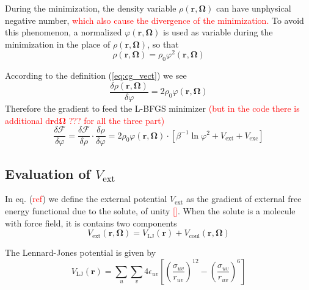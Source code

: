 During the minimization, the density variable $\rho(\mathbf{r},\mathbf{\Omega})$
can have unphysical negative number, \textcolor{red}{which also cause
the divergence of the minimization.} To avoid this phenomenon, a normalized
$\varphi(\mathbf{r},\mathbf{\Omega})$ is used as variable during
the minimization in the place of $\rho(\mathbf{r},\mathbf{\Omega})$,
so that
\begin{equation}
\rho(\mathbf{r},\mathbf{\Omega})=\rho_{0}\varphi^{2}(\mathbf{r},\mathbf{\Omega})\label{eq:cg_vect}
\end{equation}


According to the definition (\ref{eq:cg_vect}) we see
\begin{equation}
\frac{\delta\rho(\mathbf{r},\mathbf{\Omega})}{\delta\varphi}=2\rho_{0}\varphi(\mathbf{r},\mathbf{\Omega})
\end{equation}
Therefore the gradient to feed the L-BFGS minimizer \textcolor{red}{(but
in the code there is additional $\mathrm{d}\mathbf{r}\mathrm{d}\mathbf{\Omega}$
??? for all the three part)}
\begin{equation}
\frac{\delta\mathcal{F}}{\delta\varphi}=\frac{\delta\mathcal{F}}{\delta\rho}\cdot\frac{\delta\rho}{\delta\varphi}=2\rho_{0}\varphi(\mathbf{r},\mathbf{\Omega})\cdot\left[\beta^{-1}\ln\varphi^{2}+V_{\mathrm{ext}}+V_{\mathrm{exc}}\right]
\end{equation}



\subsection{Evaluation of $V_{\mathrm{ext}}$}

In eq. (\textcolor{red}{ref}) we define the external potential $V_{\mathrm{ext}}$
as the gradient of external free energy functional due to the solute,
of unity \textcolor{red}{{[}{]}}. When the solute is a molecule with
force field, it is contains two components
\begin{equation}
V_{\mathrm{ext}}(\mathbf{r},\mathbf{\Omega})=V_{\mathrm{LJ}}(\mathbf{r})+V_{\mathrm{coul}}(\mathbf{r},\mathbf{\Omega})
\end{equation}


The Lennard-Jones potential is given by
\begin{equation}
V_{\mathrm{LJ}}(\mathbf{r})=\sum_{u}\sum_{v}4\epsilon_{uv}\left[\left(\dfrac{\sigma_{uv}}{r_{uv}}\right)^{12}-\left(\dfrac{\sigma_{uv}}{r_{uv}}\right)^{6}\right]\label{eq:LJ}
\end{equation}


